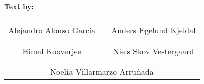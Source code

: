 %
\textbf{Text by:}\\
\vspace{-12 pt}
\begin{table}[H]
	\centering
		\begin{tabular}{c c c}
			\underline{\phantom{JAERJAERJAERJAERGO}} & \phantom{cookies} & \underline{\phantom{JAERJAERJAERJAERGO}} \\
			Alejandro Alonso García & \phantom{cookies} & Anders Egelund Kjeldal \\
			&&\\
			\underline{\phantom{JAERJAERJAERJAERGO}} & \phantom{cookies} & \underline{\phantom{JAERJAERJAERJAERGO}} \\
			Himal Kooverjee & \phantom{cookies} & Niels Skov Vestergaard		\\
			&&\\
	    \multicolumn{3}{c}{\underline{\phantom{JAERJAERJAERJAERGO}}}\\
	    \multicolumn{3}{c}{Noelia Villarmarzo Arruñada}\\				
		\end{tabular}
\end{table}
\pagebreak